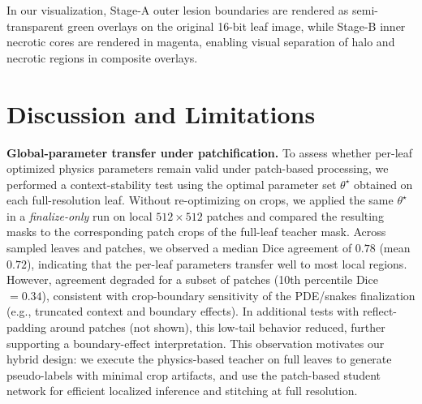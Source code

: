\documentclass[journal]{IEEEtran}
\begin{document}
In our visualization, Stage-A outer lesion boundaries are rendered as semi-transparent green overlays on the original 16-bit leaf image, while Stage-B inner necrotic cores are rendered in magenta, enabling visual separation of halo and necrotic regions in composite overlays.

\section{Discussion and Limitations}

\textbf{Global-parameter transfer under patchification.}
To assess whether per-leaf optimized physics parameters remain valid under patch-based processing, we performed a context-stability test using the optimal parameter set $\theta^\star$ obtained on each full-resolution leaf. Without re-optimizing on crops, we applied the same $\theta^\star$ in a \emph{finalize-only} run on local $512\times512$ patches and compared the resulting masks to the corresponding patch crops of the full-leaf teacher mask. Across sampled leaves and patches, we observed a median Dice agreement of $0.78$ (mean $0.72$), indicating that the per-leaf parameters transfer well to most local regions. However, agreement degraded for a subset of patches (10th percentile Dice $=0.34$), consistent with crop-boundary sensitivity of the PDE/snakes finalization (e.g., truncated context and boundary effects). In additional tests with reflect-padding around patches (not shown), this low-tail behavior reduced, further supporting a boundary-effect interpretation. This observation motivates our hybrid design: we execute the physics-based teacher on full leaves to generate pseudo-labels with minimal crop artifacts, and use the patch-based student network for efficient localized inference and stitching at full resolution.
\end{document}
